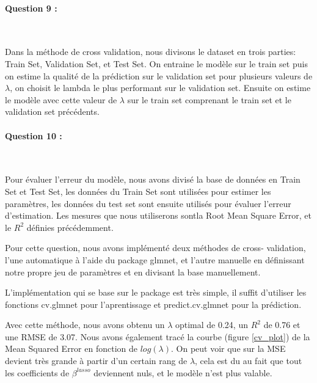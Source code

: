 \documentclass{article}
\begin{document}
	\paragraph{Question 9 :}
	~\par
	
	Dans la méthode de cross validation, nous divisons le dataset en trois parties: 
	Train Set, Validation Set, et Test Set.
	On entraine le modèle sur le train set puis on estime la qualité de la prédiction sur le validation set pour plusieurs valeurs de $\lambda$, on choisit le lambda le plus performant sur le validation set. Ensuite on estime le modèle avec cette valeur de $\lambda$ sur le train set comprenant le train set et le validation set précédents.
	
	\paragraph{Question 10 :}
	~\par
	
	Pour évaluer l'erreur du modèle, nous avons divisé la base de données en Train Set et Test Set, les données du Train Set sont utilisées pour estimer les paramètres, les données du test set sont ensuite utilisés pour évaluer l'erreur d'estimation. Les mesures que nous utiliserons sontla Root Mean Square Error, et le $R^{2}$ définies précédemment.
	
	Pour cette question, nous avons implémenté deux méthodes de cross- validation, l'une automatique à l'aide du package glmnet, et l'autre manuelle en définissant notre propre jeu de paramètres et en divisant la base manuellement.
	
	L'implémentation qui se base sur le package est très simple, il suffit d'utiliser les fonctions cv.glmnet pour l'aprentissage et predict.cv.glmnet pour la prédiction.

	Avec cette méthode, nous avons obtenu un $\lambda$ optimal de 0.24, un $R^{2}$ de 0.76 et une RMSE de 3.07. Nous avons également tracé la courbe (figure \ref{cv_plot}) de la Mean Squared Error en fonction de $log(\lambda)$. On peut voir que sur la MSE devient très grande à partir d'un certain rang de $\lambda$, cela est du au fait que tout les coefficients de $\beta^{lasso}$ deviennent nuls, et  le modèle n'est plus valable.
	
\end{document}

